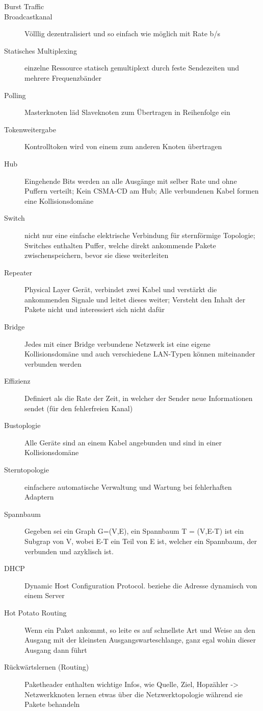 \documentclass[10pt,landscape]{article}
\begin{document}
\begin{multicols}{3}
\begin{description}
    \item[Burst Traffic]
    \item[Broadcastkanal] Völllig dezentralisiert und so einfach wie möglich mit Rate b/s 
    \item[Statisches Multiplexing] einzelne Ressource statisch gemultiplext durch feste Sendezeiten und mehrere Frequenzbänder
    \item[Polling] Masterknoten läd Slaveknoten zum Übertragen in Reihenfolge ein
    \item[Tokenweitergabe] Kontrolltoken wird von einem zum anderen Knoten übertragen
    \item[Hub] Eingehende Bits werden an alle Ausgänge mit selber Rate und ohne Puffern verteilt; Kein CSMA-CD am Hub; Alle verbundenen Kabel formen eine Kollisionsdomäne
    \item[Switch] nicht nur eine einfache elektrische Verbindung für sternförmige Topologie; Switches enthalten Puffer, welche direkt ankommende Pakete zwischenspeichern, bevor sie diese weiterleiten
    \item[Repeater] Physical Layer Gerät, verbindet zwei Kabel und verstärkt die ankommenden Signale und leitet dieses weiter; Versteht den Inhalt der Pakete nicht und interessiert sich nicht dafür
    \item[Bridge] Jedes mit einer Bridge verbundene Netzwerk ist eine eigene Kollisionsdomäne und auch verschiedene LAN-Typen können miteinander verbunden werden
    \item[Effizienz] Definiert als die Rate der Zeit, in welcher der Sender neue Informationen sendet (für den fehlerfreien Kanal)
    \item[Bustoplogie] Alle Geräte sind an einem Kabel angebunden und sind in einer Kollisionsdomäne
    \item[Sterntopologie] einfachere automatische Verwaltung und Wartung bei fehlerhaften Adaptern
    \item[Spannbaum] Gegeben sei ein Graph G=(V,E), ein Spannbaum T = (V,E-T) ist ein Subgrap von V, wobei E-T ein Teil von E ist, welcher ein Spannbaum, der verbunden und azyklisch ist. 
    \item[DHCP] Dynamic Host Configuration Protocol. beziehe die Adresse dynamisch von einem Server 
    \item[Hot Potato Routing] Wenn ein Paket ankommt, so leite es auf schnellste Art und Weise an den Ausgang mit der kleinsten Ausgangswarteschlange, ganz egal wohin dieser Ausgang dann führt
    \item[Rückwärtslernen (Routing)] Paketheader enthalten wichtige Infos, wie Quelle, Ziel, Hopzähler -> Netzwerkknoten lernen etwas über die Netzwerktopologie während sie Pakete behandeln

\end{description}
\end{multicols}
\end{document}
